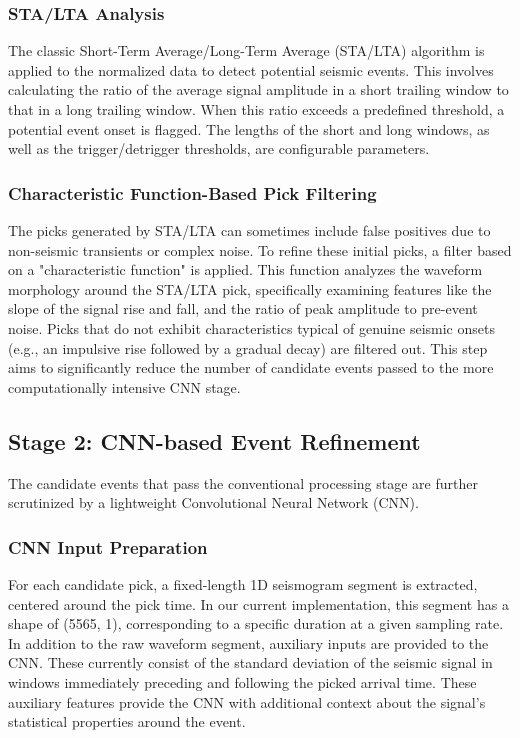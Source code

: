 \documentclass[11pt,a4paper]{article}
\begin{document}
\subsubsection{STA/LTA Analysis}
The classic Short-Term Average/Long-Term Average (STA/LTA) algorithm \citep{allen1982automatic} is applied to the normalized data to detect potential seismic events. This involves calculating the ratio of the average signal amplitude in a short trailing window to that in a long trailing window. When this ratio exceeds a predefined threshold, a potential event onset is flagged. The lengths of the short and long windows, as well as the trigger/detrigger thresholds, are configurable parameters.

\subsubsection{Characteristic Function-Based Pick Filtering}
The picks generated by STA/LTA can sometimes include false positives due to non-seismic transients or complex noise. To refine these initial picks, a filter based on a "characteristic function" is applied. This function analyzes the waveform morphology around the STA/LTA pick, specifically examining features like the slope of the signal rise and fall, and the ratio of peak amplitude to pre-event noise. Picks that do not exhibit characteristics typical of genuine seismic onsets (e.g., an impulsive rise followed by a gradual decay) are filtered out. This step aims to significantly reduce the number of candidate events passed to the more computationally intensive CNN stage.

\subsection{Stage 2: CNN-based Event Refinement}
The candidate events that pass the conventional processing stage are further scrutinized by a lightweight Convolutional Neural Network (CNN).

\subsubsection{CNN Input Preparation}
For each candidate pick, a fixed-length 1D seismogram segment is extracted, centered around the pick time. In our current implementation, this segment has a shape of (5565, 1), corresponding to a specific duration at a given sampling rate.
In addition to the raw waveform segment, auxiliary inputs are provided to the CNN. These currently consist of the standard deviation of the seismic signal in windows immediately preceding and following the picked arrival time. These auxiliary features provide the CNN with additional context about the signal's statistical properties around the event.
\end{document}
